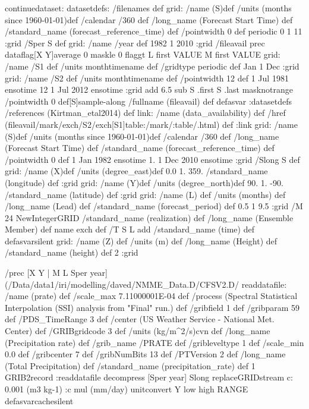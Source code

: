 \begin{ingrid}
continuedataset:
datasetdefs:
/filenames {
} def
grid:
/name (S)def
/units (months since 1960-01-01)def
/calendar /360 def
/long_name (Forecast Start Time) def
/standard_name (forecast_reference_time) def
/pointwidth 0 def
periodic
0 1 11
:grid
/Sper S def
grid:
/name /year def
1982 1 2010
:grid
/fileavail {
prec dataflag[X Y]average 0 maskle 0 flaggt L first VALUE M first VALUE grid: /name /S1 def /units monthtimename def /gridtype periodic def Jan 1 Dec :grid grid: /name /S2 def /units monthtimename def /pointwidth 12 def 1 Jul 1981 ensotime 12 1 Jul 2012 ensotime :grid add 6.5 sub S .first S .last masknotrange /pointwidth 0 def[S]sample-along /fullname (fileavail) def
} defasvar
:datasetdefs
/references (Kirtman_etal2014) def
link:
/name (data_availability) def
/href (fileavail/mark/exch/S2/exch[S1]table:/mark/:table/.html) def 
:link
grid:
/name (S)def
/units (months since 1960-01-01)def
/calendar /360 def
/long_name (Forecast Start Time) def
/standard_name (forecast_reference_time) def
/pointwidth 0 def
1 Jan 1982 ensotime
 1. 
1 Dec 2010 ensotime
:grid
/Slong S def
grid:
/name (X)def
/units (degree_east)def
 0.0 1. 359.
/standard_name (longitude) def
:grid
grid:
/name (Y)def
/units (degree_north)def
 90. 1. -90.
/standard_name (latitude) def
:grid
grid:
/name (L) def
/units (months) def
/long_name (Lead) def
/standard_name (forecast_period) def
0.5 1 9.5
:grid
/M 24 NewIntegerGRID
/standard_name (realization) def
/long_name (Ensemble Member) def
 name exch def
/T { S L add
/standard_name (time) def } defasvarsilent
grid:
/name (Z) def
/units (m) def
/long_name (Height) def
/standard_name (height) def
2 :grid
\end{ingrid}
\begin{ingrid}
 /prec{
[X
    Y  |
    M L Sper year] (/Data/data1/iri/modelling/daved/NMME_Data.D/CFSV2.D/%
readdatafile:
/name (prate) def
 /scale_max 7.11000001E-04 def
 /process (Spectral Statistical Interpolation (SSI) analysis from "Final" run.) def
 /gribfield 1 def
 /gribparam 59 def
 /PDS_TimeRange 3 def
 /center (US Weather Service - National Met. Center) def
 /GRIBgridcode 3 def
 /units (kg/m^2/s)cvn def
 /long_name (Precipitation rate) def
 /grib_name /PRATE def
 /gribleveltype 1 def
 /scale_min 0.0 def
 /gribcenter 7 def
 /gribNumBits 13 def
 /PTVersion 2 def
/long_name (Total Precipitation) def
/standard_name (precipitation_rate) def
1 GRIB2record :readdatafile
decompress
[Sper year] Slong replaceGRIDstream
c: 0.001 (m3 kg-1) :c
mul (mm/day) unitconvert
Y low high RANGE
}defasvarcachesilent
\end{ingrid}
